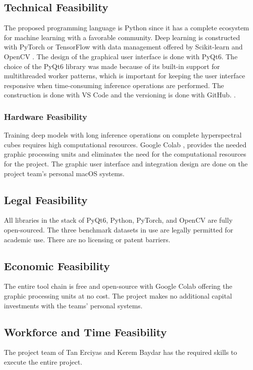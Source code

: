 \subsection{Technical Feasibility}
The proposed programming language is Python \cite{van1995python} since it has a complete ecosystem for machine learning with a favorable community. Deep learning is constructed with PyTorch \cite{paszke2019pytorch} or TensorFlow \cite{abadi2016tensorflow} with data management offered by Scikit-learn \cite{pedregosa2011scikit} and OpenCV \cite{itseez2015opencv}. The design of the graphical user interface is done with PyQt6. The choice of the PyQt6 library was made because of its built-in support for multithreaded worker patterns, which is important for keeping the user interface responsive when time-consuming inference operations are performed. The construction is done with VS Code \cite{baumer2015visual} and the versioning is done with GitHub. \cite{dabbish2012social}.

\subsubsection{Hardware Feasibility}
Training deep models with long inference operations on complete hyperspectral cubes requires high computational resources. Google Colab \cite{bisong2019google}, provides the needed graphic processing units and eliminates the need for the computational resources for the project. The graphic user interface and integration design are done on the project team’s personal macOS systems.

\subsection{Legal Feasibility}
All libraries in the stack of PyQt6, Python, PyTorch, and OpenCV are fully open-sourced. The three benchmark datasets in use are legally permitted for academic use. There are no licensing or patent barriers.

\subsection{Economic Feasibility}
The entire tool chain is free and open-source with Google Colab offering the graphic processing units at no cost. The project makes no additional capital investments with the teams’ personal systems.

\subsection{Workforce and Time Feasibility}
The project team of Tan Erciyas and Kerem Baydar has the required skills to execute the entire project.

